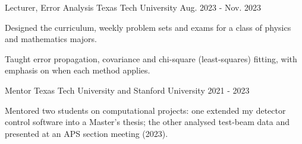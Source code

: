 \begin{cventries}
  \cventry
    {Lecturer, Error Analysis} %
    {Texas Tech University} %
    {} %
    {Aug. 2023 - Nov. 2023} %
    {
      \begin{cvitems}
      \item {Designed the curriculum, weekly problem sets and exams for a class of physics and mathematics majors.}
      \item {Taught error propagation, covariance and chi-square (least-squares) fitting, with emphasis on when each method applies.}
      \end{cvitems}
    }
  \cventry
    {Mentor} %
    {Texas Tech University and Stanford University} %
    {} %
    {2021 - 2023} %
    {
      \begin{cvitems}
      \item {Mentored two students on computational projects: one extended my detector control software into a Master's thesis; the other analysed test-beam data and presented at an APS section meeting (2023).}
      \end{cvitems}
    }
\end{cventries}
